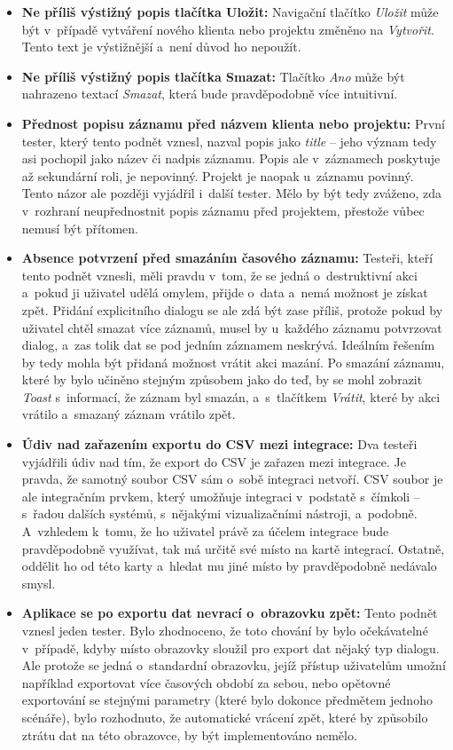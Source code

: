 \begin{itemize}
\item\textbf{Ne příliš výstižný popis tlačítka Uložit:} Navigační tlačítko \emph{Uložit} může být v~případě vytváření nového klienta nebo projektu změněno na \emph{Vytvořit}. Tento text je výstižnější a~není důvod ho nepoužít.
\item\textbf{Ne příliš výstižný popis tlačítka Smazat:} Tlačítko \emph{Ano} může být nahrazeno textací \emph{Smazat}, která bude pravděpodobně více intuitivní.
\item\textbf{Přednost popisu záznamu před názvem klienta nebo projektu:} První tester, který tento podnět vznesl, nazval popis jako \emph{title} – jeho význam tedy asi pochopil jako název či nadpis záznamu. Popis ale v~záznamech poskytuje až sekundární roli, je nepovinný. Projekt je naopak u~záznamu povinný. Tento názor ale později vyjádřil i~další tester. Mělo by být tedy zváženo, zda v~rozhraní neupřednostnit popis záznamu před projektem, přestože vůbec nemusí být přítomen.
\item\textbf{Absence potvrzení před smazáním časového záznamu:} Testeři, kteří tento podnět vznesli, měli pravdu v~tom, že se jedná o~destruktivní akci a~pokud ji uživatel udělá omylem, přijde o~data a~nemá možnost je získat zpět. Přidání explicitního dialogu se ale zdá být zase příliš, protože pokud by uživatel chtěl smazat více záznamů, musel by u~každého záznamu potvrzovat dialog, a~zas tolik dat se pod jedním záznamem neskrývá. Ideálním řešením by tedy mohla být přidaná možnost vrátit akci mazání. Po smazání záznamu, které by bylo učiněno stejným způsobem jako do teď, by se mohl zobrazit \emph{Toast} s~informací, že záznam byl smazán, a~s~tlačítkem \emph{Vrátit}, které by akci vrátilo a~smazaný záznam vrátilo zpět.
\item\textbf{Údiv nad zařazením exportu do CSV mezi integrace:} Dva testeři vyjádřili údiv nad tím, že export do CSV je zařazen mezi integrace. Je pravda, že samotný soubor CSV sám o~sobě integraci netvoří. CSV soubor je ale integračním prvkem, který umožňuje integraci v~podstatě s~čímkoli – s~řadou dalších systémů, s~nějakými vizualizačními nástroji, a~podobně. A~vzhledem k~tomu, že ho uživatel právě za účelem integrace bude pravděpodobně využívat, tak má určitě své místo na kartě integrací. Ostatně, oddělit ho od této karty a~hledat mu jiné místo by pravděpodobně nedávalo smysl.
\item\textbf{Aplikace se po exportu dat nevrací o~obrazovku zpět:} Tento podnět vznesl jeden tester. Bylo zhodnoceno, že toto chování by bylo očekávatelné v~případě, kdyby místo obrazovky sloužil pro export dat nějaký typ dialogu. Ale protože se jedná o~standardní obrazovku, jejíž přístup uživatelům umožní například exportovat více časových období za sebou, nebo opětovné exportování se stejnými parametry (které bylo dokonce předmětem jednoho scénáře), bylo rozhodnuto, že automatické vrácení zpět, které by způsobilo ztrátu dat na této obrazovce, by být implementováno nemělo.

\end{itemize}
